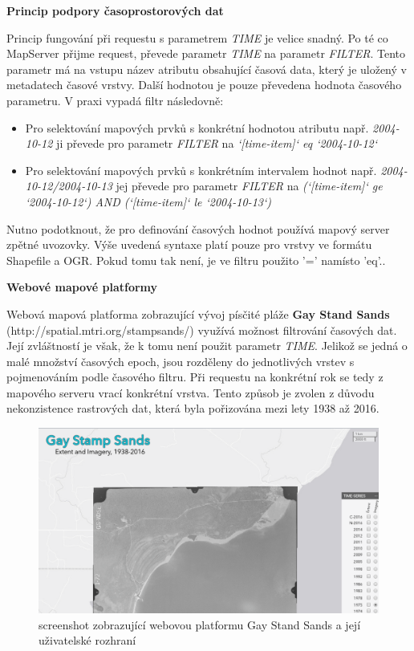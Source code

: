\bigskip
\noindent
\textbf{Princip podpory časoprostorových dat}

Princip fungování při requestu s parametrem \textit{TIME} je velice snadný. Po té co MapServer přijme request, převede parametr \textit{TIME} na parametr \textit{FILTER}. Tento parametr má na vstupu název atributu obsahující časová data, který je uložený v metadatech časové vrstvy\cite{mapserver_about}. Další hodnotou je pouze převedena hodnota časového parametru. V praxi vypadá filtr následovně:

\bigskip
\begin{itemize}
	\item Pro selektování mapových prvků s konkrétní hodnotou atributu např. \textit{2004-10-12} ji převede pro parametr \textit{FILTER} na \textit{`[time-item]` eq `2004-10-12`}
	\item Pro selektování mapových prvků s konkrétním intervalem hodnot např. \textit{2004-10-12/2004-10-13} jej převede pro parametr \textit{FILTER} na \textit{(`[time-item]` ge `2004-10-12`) AND (`[time-item]` le `2004-10-13`)}	
\end{itemize}

\bigskip
Nutno podotknout, že pro definování časových hodnot používá mapový server zpětné uvozovky. Výše uvedená syntaxe platí pouze pro vrstvy ve formátu Shapefile a OGR. Pokud tomu tak není, je ve filtru použito '=' namísto 'eq'.\cite{mapserver_about}.

\bigskip
\noindent
\textbf{Webové mapové platformy}

Webová mapová platforma zobrazující vývoj písčité pláže \textbf{Gay Stand Sands} (http://spatial.mtri.org/stampsands/) využívá možnost filtrování časových dat. Její zvláštností je však, že k tomu není použit parametr \textit{TIME}. Jelikož se jedná o malé množství časových epoch, jsou rozděleny do jednotlivých vrstev s pojmenováním podle časového filtru. Při requestu na konkrétní rok se tedy z mapového serveru vrací konkrétní vrstva. Tento způsob je zvolen z důvodu nekonzistence rastrových dat, která byla pořizována mezi lety 1938 až 2016.

\begin{figure}[h!]
	\centering
	\includegraphics[width=1\textwidth]{../img/gay-sands.png}
	\caption{screenshot zobrazující webovou platformu Gay Stand Sands a její uživatelské rozhraní}
	\label{fig:gay-sands}
\end{figure}

